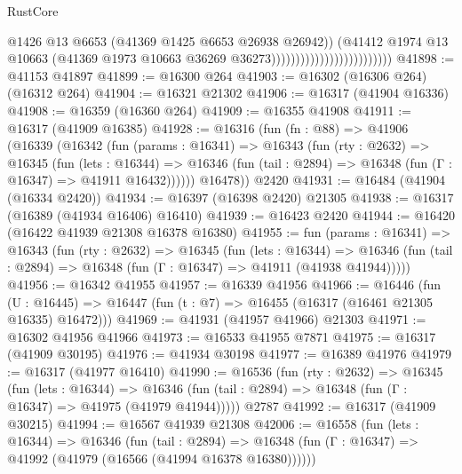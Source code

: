 \begin{lexlean}{RustCore}
\begin{coremodule}
                                                    @1426
                                                    @13
                                                    @6653
                                                    (@41369 @1425 @6653 @26938 @26942))
                                                  (@41412
                                                    @1974
                                                    @13
                                                    @10663
                                                    (@41369
                                                      @1973
                                                      @10663
                                                      @36269
                                                      @36273)))))))))))))))))))))))))
@41898 := @41153 @41897
@41899 := @16300 @264
@41903 := @16302 (@16306 @264) (@16312 @264)
@41904 := @16321 @21302
@41906 := @16317 (@41904 @16336)
@41908 := @16359 (@16360 @264)
@41909 := @16355 @41908
@41911 := @16317 (@41909 @16385)
@41928 := @16316
    (fun (fn : @88) =>
    @41906
      (@16339
        (@16342
          (fun (params : @16341) =>
          @16343
            (fun (rty : @2632) =>
            @16345
              (fun (lets : @16344) =>
              @16346 (fun (tail : @2894) => @16348 (fun (Γ : @16347) => @41911 @16432))))))
        @16478))
    @2420
@41931 := @16484 (@41904 (@16334 @2420))
@41934 := @16397 (@16398 @2420) @21305
@41938 := @16317 (@16389 (@41934 @16406) @16410)
@41939 := @16423 @2420
@41944 := @16420 (@16422 @41939 @21308 @16378 @16380)
@41955 := fun (params : @16341) =>
  @16343
    (fun (rty : @2632) =>
    @16345
      (fun (lets : @16344) =>
      @16346 (fun (tail : @2894) => @16348 (fun (Γ : @16347) => @41911 (@41938 @41944)))))
@41956 := @16342 @41955
@41957 := @16339 @41956
@41966 := @16446
    (fun (U : @16445) => @16447 (fun (t : @7) => @16455 (@16317 (@16461 @21305 @16335) @16472)))
@41969 := @41931 (@41957 @41966) @21303
@41971 := @16302 @41956 @41966
@41973 := @16533 @41955 @7871
@41975 := @16317 (@41909 @30195)
@41976 := @41934 @30198
@41977 := @16389 @41976
@41979 := @16317 (@41977 @16410)
@41990 := @16536
    (fun (rty : @2632) =>
    @16345
      (fun (lets : @16344) =>
      @16346 (fun (tail : @2894) => @16348 (fun (Γ : @16347) => @41975 (@41979 @41944)))))
    @2787
@41992 := @16317 (@41909 @30215)
@41994 := @16567 @41939 @21308
@42006 := @16558
    (fun (lets : @16344) =>
    @16346
      (fun (tail : @2894) =>
      @16348 (fun (Γ : @16347) => @41992 (@41979 (@16566 (@41994 @16378 @16380))))))

\end{coremodule}
\end{lexlean}
